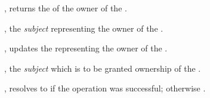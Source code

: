 \begin{interface}
\item \specification{}

  \begin{functions}
    \item {}, returns the  of the owner of
      the .

      \begin{returns}
        \item {}, the \emph{subject} representing the owner of
          the .
      \end{returns}

    \item {}, updates the 
      representing the owner of the .



      \begin{parameters}
      \item {}, the \emph{subject} which is to be granted
        ownership of the .\footnotemark{}

      \end{parameters}

      \begin{returns}
      \item {}, resolves to  if the operation was
        successful; otherwise .
      \end{returns}
  \end{functions}
\end{interface}
